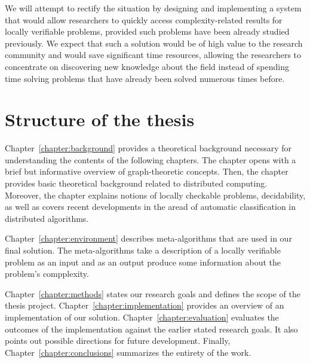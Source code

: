 We will attempt to rectify the
situation by designing and implementing a system
that would allow researchers to quickly
access complexity-related results for locally
verifiable problems, provided such problems have been
already studied
previously. We expect that such a solution
would be of high value to the research community and
would save significant time resources, allowing the researchers
to concentrate on discovering new knowledge about the
field instead of spending time solving problems that
have already been solved numerous times before.

\section{Structure of the thesis}
\label{section:structure} 

Chapter~\ref{chapter:background} provides a theoretical
background necessary for understanding the contents of the
following chapters. The chapter opens with
a brief but informative overview of graph-theoretic
concepts. Then, the chapter provides basic
theoretical background related to distributed computing.
Moreover, the chapter explains notions of
locally checkable problems, decidability, as well as
covers recent developments in the aread of
automatic classification in distributed algorithms.

Chapter~\ref{chapter:environment} describes
meta-algorithms that are used in our final
solution. The meta-algorithms take a description
of a locally verifiable problem as an input and
as an output produce some information about the
problem's compplexity.

Chapter~\ref{chapter:methods} states our research goals
and defines the scope of the thesis project.
Chapter~\ref{chapter:implementation}
provides an overview of an implementation of
our solution. Chapter~\ref{chapter:evaluation}
evaluates the outcomes of the implementation
against the earlier stated research goals. It
also points out possible directions for
future development. Finally, Chapter~\ref{chapter:conclusions}
summarizes the entirety of the work.
